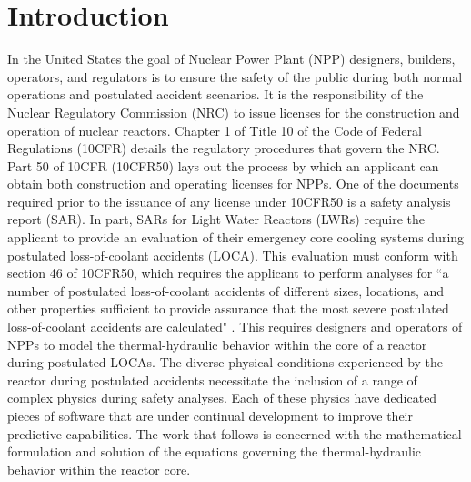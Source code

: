 \chapter{Introduction}
\label{chap:intro}
In the United States the goal of Nuclear Power Plant (NPP) designers, builders, operators, and regulators is to ensure the safety of the public during both normal operations and postulated accident scenarios.
It is the responsibility of the Nuclear Regulatory Commission (NRC) to issue licenses for the construction and operation of nuclear reactors.
Chapter 1 of Title 10 of the Code of Federal Regulations (10CFR) details the regulatory procedures that govern the NRC.
Part 50 of 10CFR (10CFR50) lays out the process by which an applicant can obtain both construction and operating licenses for NPPs.
One of the documents required prior to the issuance of any license under 10CFR50 is a safety analysis report (SAR).
In part, SARs for Light Water Reactors (LWRs) require the applicant to provide an evaluation of their emergency core cooling systems during postulated loss-of-coolant accidents (LOCA).
This evaluation must conform with section 46 of 10CFR50, which requires the applicant to perform analyses for ``a number of postulated loss-of-coolant accidents of different sizes, locations, and other properties sufficient to provide assurance that the most severe postulated loss-of-coolant accidents are calculated" \cite{CFR10}.
This requires designers and operators of NPPs to model the thermal-hydraulic behavior within the core of a reactor during postulated LOCAs.  
The diverse physical conditions experienced by the reactor during postulated accidents necessitate the inclusion of a range of complex physics during safety analyses.
Each of these physics have dedicated pieces of software that are under continual development to improve their predictive capabilities.
The work that follows is concerned with the mathematical formulation and solution of the equations governing the thermal-hydraulic behavior within the reactor core.

